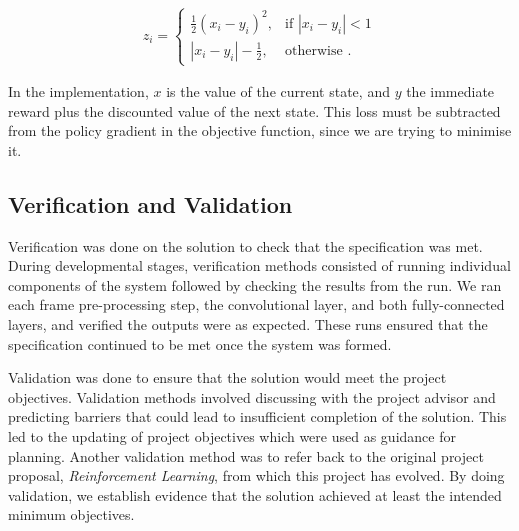 \documentclass[12pt,a4paper]{article}
\begin{document}
\[\begin{aligned}
z_{i} =
\begin{cases}
\frac{1}{2} (x_i - y_i)^2, & \text{if } |x_i - y_i| < 1 \\
|x_i - y_i| - \frac{1}{2}, & \text{otherwise }.
\end{cases}
\end{aligned}\]

In the implementation, $x$ is the value of the current state, and $y$ the immediate reward plus the discounted value of the next state. This loss must be subtracted from the policy gradient in the objective function, since we are trying to minimise it.

\subsection{Verification and Validation}
Verification was done on the solution to check that the specification was met. During developmental stages, verification methods consisted of running individual components of the system followed by checking the results from the run. We ran each frame pre-processing step, the convolutional layer, and both fully-connected layers, and verified the outputs were as expected. These runs ensured that the specification continued to be met once the system was formed.


Validation was done to ensure that the solution would meet the project objectives. Validation methods involved discussing with the project advisor and predicting barriers that could lead to insufficient completion of the solution. This led to the updating of project objectives which were used as guidance for planning. Another validation method was to refer back to the original project proposal, \textit{Reinforcement Learning}, from which this project has evolved. By doing validation, we establish evidence that the solution achieved at least the intended minimum objectives.  
\end{document}
